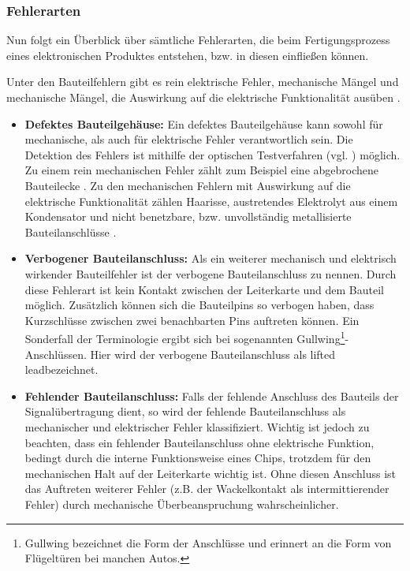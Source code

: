 \subsubsection{Fehlerarten}
    \label{subsubsection: Fehlerarten}
    Nun folgt ein Überblick über sämtliche Fehlerarten, die beim Fertigungsprozess eines elektronischen Produktes entstehen, bzw. in diesen einfließen können.

        Unter den Bauteilfehlern gibt es rein elektrische Fehler, mechanische Mängel und mechanische Mängel, die Auswirkung auf die elektrische Funktionalität ausüben \cite{berger_test-_2012}.

        \begin{itemize}
            \item \textbf{Defektes Bauteilgehäuse:} Ein defektes Bauteilgehäuse kann sowohl für mechanische, als auch für elektrische Fehler verantwortlich sein. Die Detektion des Fehlers ist mithilfe der optischen Testverfahren (vgl. ) möglich. Zu einem rein mechanischen Fehler zählt zum Beispiel eine abgebrochene Bauteilecke \cite{berger_test-_2012}. Zu den mechanischen Fehlern mit Auswirkung auf die elektrische Funktionalität zählen Haarisse, austretendes Elektrolyt aus einem Kondensator \cite{berger_test-_2012} und nicht benetzbare, bzw. unvollständig metallisierte Bauteilanschlüsse \cite{stiny_fertigung_2010}.
            \item \textbf{Verbogener Bauteilanschluss:} Als ein weiterer mechanisch und elektrisch wirkender Bauteilfehler ist der verbogene Bauteilanschluss zu nennen. Durch diese Fehlerart ist kein Kontakt zwischen der Leiterkarte und dem Bauteil möglich. Zusätzlich können sich die Bauteilpins so verbogen haben, dass Kurzschlüsse zwischen zwei benachbarten Pins auftreten können. Ein Sonderfall der Terminologie ergibt sich bei sogenannten Gullwing\footnote{Gullwing bezeichnet die Form der Anschlüsse und erinnert an die Form von Flügeltüren bei manchen Autos.}-Anschlüssen. Hier wird der verbogene Bauteilanschluss als \glqq lifted lead\grqq\@ bezeichnet. \cite{berger_test-_2012}
            \item \textbf{Fehlender Bauteilanschluss:} Falls der fehlende Anschluss des Bauteils der Signalübertragung dient, so wird der fehlende Bauteilanschluss als mechanischer und elektrischer Fehler klassifiziert. Wichtig ist jedoch zu beachten, dass ein fehlender Bauteilanschluss ohne elektrische Funktion, bedingt durch die interne Funktionsweise eines Chips, trotzdem für den mechanischen Halt auf der Leiterkarte wichtig ist. Ohne diesen Anschluss ist das Auftreten weiterer Fehler (z.B. der Wackelkontakt als intermittierender Fehler) durch mechanische Überbeanspruchung wahrscheinlicher.

\end{itemize}
